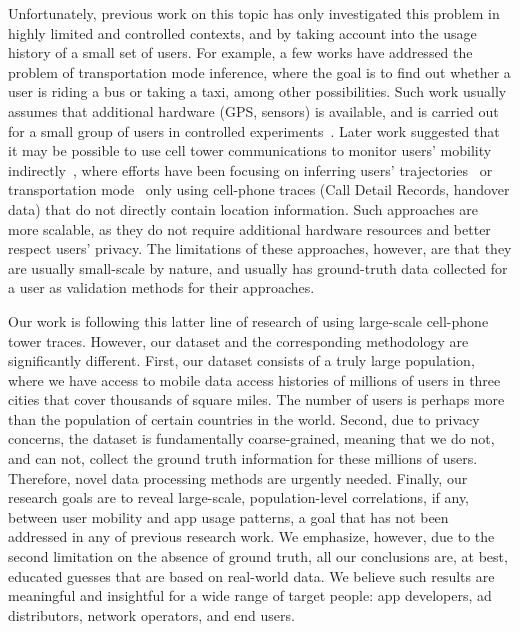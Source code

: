 Unfortunately, previous work on this topic has only investigated this problem in highly limited and controlled contexts,
and by taking account into the usage history of a small set of users.
For example, a few works have addressed the problem of transportation mode inference,
where the goal is to find out whether a user is riding a bus or taking a taxi, among other possibilities.
Such work usually assumes that additional hardware (\eg GPS, sensors) is available,
and is carried out for a small group of users in controlled experiments~\cite{6958169, 6450942, zheng2010understanding, biljecki2013transportation, stenneth2011transportation, 5283030, 6460199, Reddy:2010:UMP:1689239.1689243}.
Later work suggested that it may be possible to use cell tower communications to monitor users' mobility indirectly~\cite{rose2006mobile},
where efforts have been focusing on inferring users' trajectories~\cite{Alsolami2012Auth,jiang2013review}
or transportation mode~\cite{wang2010transportation,bekhor2015investigation} only using cell-phone traces
(\eg Call Detail Records, handover data) that do not directly contain location information.
Such approaches are more scalable, as they do not require additional hardware resources and better respect users' privacy.
The limitations of these approaches, however, are that they are usually small-scale by nature, and
usually has ground-truth data collected for a user as validation methods for their approaches.

Our work is following this latter line of research of using large-scale cell-phone tower traces.
However, our dataset and the corresponding methodology are significantly different.
First, our dataset consists of a truly large population,
where we have access to mobile data access histories of millions of users in three cities that cover thousands of square miles.
The number of users is perhaps more than the population of certain countries in the world.
Second, due to privacy concerns, the dataset is fundamentally coarse-grained,
meaning that we do not, and can not, collect the ground truth information for these millions of users.
Therefore, novel data processing methods are urgently needed.
Finally, our research goals are to reveal large-scale, population-level correlations,
if any, between user mobility and app usage patterns,
a goal that has not been addressed in any of previous research work.
We emphasize, however, due to the second limitation on the absence of ground truth,
all our conclusions are, at best, educated guesses that are based on real-world data.
We believe such results are meaningful and insightful for a wide range of target people:
app developers, ad distributors, network operators, and end users.

